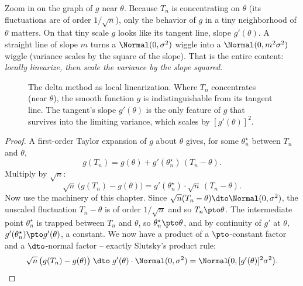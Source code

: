 \begin{intuitionbox}
Zoom in on the graph of $g$ near $\theta$. Because $T_n$ is concentrating on $\theta$
(its fluctuations are of order $1/\sqrt n$), only the behavior of $g$ in a tiny
neighborhood of $\theta$ matters. On that tiny scale $g$ looks like its tangent line,
slope $g'(\theta)$. A straight line of slope $m$ turns a $\Normal(0,\sigma^2)$ wiggle
into a $\Normal(0,m^2\sigma^2)$ wiggle (variance scales by the square of the slope).
That is the entire content: \emph{locally linearize, then scale the variance by the
slope squared.}
\end{intuitionbox}

\begin{figure}[H]
\centering
{}
\caption{The delta method as local linearization. Where $T_n$ concentrates (near
$\theta$), the smooth function $g$ is indistinguishable from its tangent line. The
tangent's slope $g'(\theta)$ is the only feature of $g$ that survives into the limiting
variance, which scales by $[g'(\theta)]^2$.}
\label{ch22:fig-delta}
\end{figure}

\begin{proof}
A first-order Taylor expansion of $g$ about $\theta$ gives, for some $\theta_n^\star$
between $T_n$ and $\theta$,
\[
  g(T_n) = g(\theta) + g'(\theta_n^\star)\,(T_n - \theta).
\]
Multiply by $\sqrt n$:
\[
  \sqrt n\,\big(g(T_n) - g(\theta)\big) = g'(\theta_n^\star)\cdot \sqrt n\,(T_n-\theta).
\]
Now use the machinery of this chapter. Since $\sqrt n(T_n-\theta)\dto\Normal(0,\sigma^2)$,
the unscaled fluctuation $T_n-\theta$ is of order $1/\sqrt n$ and so $T_n\pto\theta$.
The intermediate point $\theta_n^\star$ is trapped between $T_n$ and $\theta$, so
$\theta_n^\star\pto\theta$, and by continuity of $g'$ at $\theta$,
$g'(\theta_n^\star)\pto g'(\theta)$, a constant. We now have a product of a
$\pto$-constant factor and a $\dto$-normal factor -- exactly Slutsky's product rule:
\[
  \sqrt n\,\big(g(T_n)-g(\theta)\big)
  \;\dto\; g'(\theta)\cdot\Normal(0,\sigma^2)
  = \Normal\!\big(0,[g'(\theta)]^2\sigma^2\big).\qedhere
\]
\end{proof}

